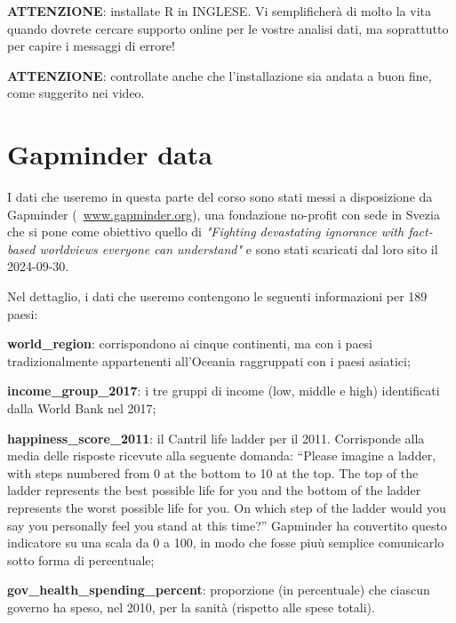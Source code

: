 \vspace{0.3cm}

\noindent \textbf{ATTENZIONE}: installate R in INGLESE. Vi semplificherà di molto la vita quando dovrete cercare supporto online per le vostre analisi dati, ma soprattutto per capire i messaggi di errore!

\vspace{0.3cm}

\noindent \textbf{ATTENZIONE}: controllate anche che l'installazione sia andata a buon fine, come suggerito nei video.


\section{Gapminder data}

I dati che useremo in questa parte del corso sono stati messi a disposizione da Gapminder (~\url{www.gapminder.org}), una fondazione no-profit con sede in Svezia che si pone come obiettivo quello di \emph{"Fighting devastating ignorance with fact-based worldviews everyone can understand"} e sono stati scaricati dal loro sito il 2024-09-30.

\vspace{0.2cm}

\noindent Nel dettaglio, i dati che useremo contengono le seguenti informazioni per 189 paesi:

\begin{myitemize}
	\item \textbf{world\_region}: corrispondono ai cinque continenti, ma con i paesi tradizionalmente appartenenti all'Oceania raggruppati con i paesi asiatici;
	\item \textbf{income\_group\_2017}: i tre gruppi di income (low, middle e high) identificati dalla World Bank nel 2017;
	\item \textbf{happiness\_score\_2011}: il Cantril life ladder per il 2011. Corrisponde alla media delle risposte ricevute alla seguente domanda: “Please imagine a ladder, with steps numbered from 0 at the bottom to 10 at the top. The top of the ladder represents the best possible life for you and the bottom of the ladder represents the worst possible life for you. On which step of the ladder would you say you personally feel you stand at this time?” Gapminder ha convertito questo indicatore su una scala da 0 a 100, in modo che fosse piu\`u semplice comunicarlo sotto forma di percentuale;
	\item \textbf{gov\_health\_spending\_percent}: proporzione (in percentuale) che ciascun governo ha speso, nel 2010, per la sanit\`a (rispetto alle spese totali).
\end{myitemize}	


